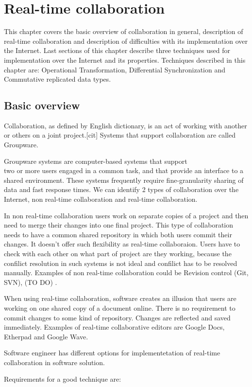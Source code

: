 \documentclass[12pt,oneside,draft]{fithesis2}
\begin{document}
\chapter{Real-time collaboration}
This chapter covers the basic overview of collaboration in general, description of real-time collaboration and description of difficulties with its implementation over the Internet. Last sections of this chapter describe three techniques used for implementation over the Internet and its properties. Techniques described in this chapter are: Operational Transformation, Differential Synchronization and Commutative replicated data types.
\section{Basic overview}
Collaboration, as defined by English dictionary, is an act of working with another or others on a joint project.[cit] Systems that support collaboration are called Groupware. \par Groupware systems are computer-based systems that support \\two or more users engaged in a common task, and that provide an interface to a shared environment. These systems frequently require fine-granularity sharing of data and fast response times.\cite{Ellis} We can identify 2 types of collaboration over the Internet, non real-time collaboration and real-time collaboration.\par
In non real-time collaboration users work on separate copies of a project and then need to merge their changes into one final project. This type of collaboration needs to have a common shared repository in which both users commit their changes. It doesn't offer such flexibility as real-time collaboraion. Users have to check with each other on what part of project are they working, because the confilict resolution in such systems is not ideal and confilict has to be resolved manually. Examples of non real-time collaboration could be Revision control (Git, SVN), (TO DO) . \par When using real-time collaboration, software creates an illusion that users are working on one shared copy of a document online. There is no requirement to commit changes to some kind of repository. Changes are reflected and saved immediately. Examples of real-time collaborative editors are Google Docs, Etherpad and Google Wave. \par Software engineer has different options for implementetation of real-time collaboration in software solution. \par Requirements for a good technique are: 
\end{document}
